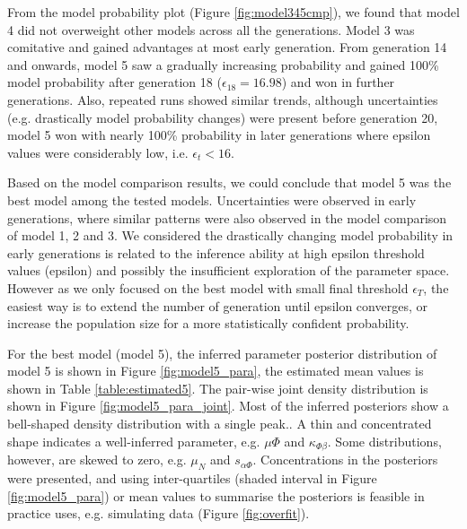 From the model probability plot (Figure \ref{fig:model345cmp}), we found that model 4 did not overweight other models across all the generations. Model 3 was comitative and gained advantages at most early generation. From generation 14 and onwards, model 5 saw a gradually increasing probability and gained 100\% model probability after generation 18 ($\epsilon_{18} = 16.98$) and won in further generations. Also, repeated runs showed similar trends, although uncertainties (e.g. drastically model probability changes) were present before generation 20, model 5 won with nearly 100\% probability in later generations where epsilon values were considerably low, i.e. $\epsilon_t<16$.

Based on the model comparison results, we could conclude that model 5 was the best model among the tested models. Uncertainties were observed in early generations, where similar patterns were also observed in the model comparison of model 1, 2 and 3. We considered the drastically changing model probability in early generations is related to the inference ability at high epsilon threshold values (epsilon) and possibly the insufficient exploration of the parameter space. However as we only focused on the best model with small final threshold $\epsilon_T$, the easiest way is to extend the number of generation until epsilon converges, or increase the population size for a more statistically confident probability.




For the best model (model 5), the inferred parameter posterior distribution of model 5 is shown in Figure \ref{fig:model5_para}, the estimated mean values is shown in Table \ref{table:estimated5}. The pair-wise joint density distribution is shown in Figure \ref{fig:model5_para_joint}. Most of the inferred posteriors show a bell-shaped density distribution with a single peak.. A thin and concentrated shape indicates a well-inferred parameter, e.g. $\mu{\Phi}$ and $\kappa_{\Phi\beta}$. Some distributions, however, are skewed to zero, e.g. $\mu_N$ and $s_{\alpha\Phi}$. Concentrations in the posteriors were presented, and using inter-quartiles (shaded interval in Figure \ref{fig:model5_para}) or mean values to summarise the posteriors is feasible in practice uses, e.g. simulating data (Figure \ref{fig:overfit}).



